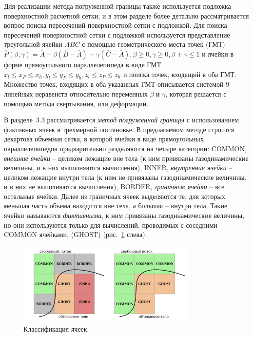 \documentclass[a4paper,14pt]{extarticle}                     %
\theoremstyle{plain}                                         %
\begin{document}
Для реализации метода погруженной границы также используется подложка поверхностной расчетной сетки, и в этом разделе более детально рассматривается вопрос поиска пересечений поверхностной сетки с подложкой.
Для поиска пересечений поверхностной сетки с подложкой используется представление треугольной ячейки $ABC$ с помощью геометрического места точек (ГМТ) $\overline{P}(\beta, \gamma) = \overline{A} + \beta (\overline{B} - \overline{A}) + \gamma (\overline{C} - \overline{A}), \beta \ge 0, \gamma \ge 0, \beta + \gamma \le 1$ и ячейки в форме прямоугольного параллелепипеда в виде ГМТ $x_l \le x_P \le x_h, y_l \le y_P \le y_h, z_l \le z_P \le z_h$ и поиска точек, входящий в оба ГМТ.
Множество точек, входящих в оба указанных ГМТ описывается системой 9 линейных неравенств относительно переменных $\beta$ и $\gamma$, которая решается с помощью метода свертывания, или деформации.


В разделе~3.3 рассматривается \textit{метод погруженной границы} с использованием фиктивных ячеек в трехмерной постановке.
В предлагаемом методе строится декартова объемная сетка, в которой ячейки в виде прямоугольных параллелепипедов предварительно разделяются на четыре категории:
COMMON, \textit{внешние ячейки} -- целиком лежащие вне тела (к ним привязаны газодинамические величины, и в них выполняются вычисления), INNER, \textit{внутренние ячейки} -- целиком лежащие внутри тела (к ним не привязаны газодинамические величины, и в них не выполняются вычисления), BORDER, \textit{граничные ячейки} -- все остальные ячейки.
Далее из граничных ячеек выделяются те, для которых меньшая часть объема находится вне тела, а большая -- внутри тела.
Такие ячейки называются \textit{фиктивными}, к ним привязаны газодинамические величины, но они используются только для вычислений, проводимых с соседними COMMON ячейками, (GHOST) (рис.~\ref{fig:text_1_immersed_boundary_method_class} слева).

\begin{figure}[ht]
\centering
\includegraphics[width=0.8\textwidth]{fig/int_cells_classification_big.pdf}
\singlespacing
\caption{Классификация ячеек.}
\label{fig:text_1_immersed_boundary_method_class}
\end{figure}
\end{document}
